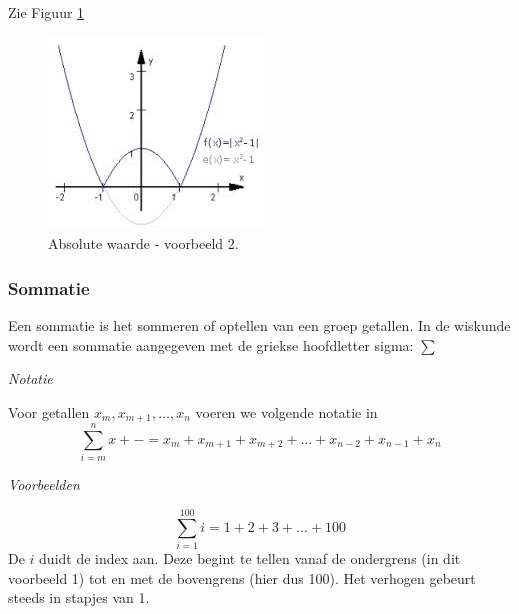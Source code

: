 \begin{voorbeeld}
	Zie Figuur \ref{fig:absvalue2}
	\begin{figure}
	\centering
	\includegraphics[width=0.7\linewidth]{1_elem_rekenvaardigheden_A/inputs/absValue2}
	\caption{Absolute waarde - voorbeeld 2.}
	\label{fig:absvalue2}
	\end{figure}	
\end{voorbeeld}

\subsubsection{Sommatie}

Een sommatie is het sommeren of optellen van een groep getallen. 
In de wiskunde wordt een sommatie aangegeven met de griekse hoofdletter sigma: $\sum$ 

\emph{Notatie}

Voor getallen $x_m,x_{m+1},\ldots,x_n$ voeren we volgende notatie in
\begin{equation*}
\sum_{i=m}^{n}x+- = x_m + x_{m+1} + x_{m+2} + \ldots + x_{n-2} + x_{n-1} + x_{n}
\end{equation*}

\emph{Voorbeelden}

\begin{voorbeeld}
	\begin{equation*}
	\sum_{i=1}^{100}i = 1+2+3+\ldots+100
	\end{equation*}
	De $i$ duidt de index aan. Deze begint te tellen vanaf de ondergrens (in dit voorbeeld 1) tot en met de bovengrens (hier dus 100). Het verhogen gebeurt steeds in stapjes van 1.
	
\end{voorbeeld}

